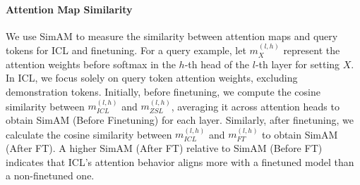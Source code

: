 \paragraph{Attention Map Similarity}
We use SimAM to measure the similarity between attention maps and query tokens for ICL and finetuning.
For a query example, let $m^{(l,h)}_X$ represent the attention weights before softmax in the $h$-th head of the $l$-th layer for setting $X$. In ICL, we focus solely on query token attention weights, excluding demonstration tokens. Initially, before finetuning, we compute the cosine similarity between $m^{(l,h)}_{ICL}$ and $m^{(l,h)}_{ZSL}$, averaging it across attention heads to obtain SimAM (Before Finetuning) for each layer.
Similarly, after finetuning, we calculate the cosine similarity between $m^{(l,h)}_{ICL}$ and $m^{(l,h)}_{FT}$ to obtain SimAM (After FT). A higher SimAM (After FT) relative to SimAM (Before FT) indicates that ICL's attention behavior aligns more with a finetuned model than a non-finetuned one.